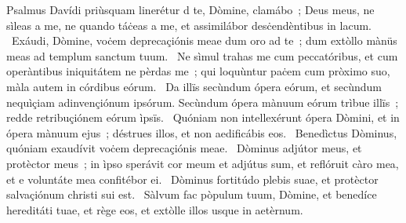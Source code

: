 { Psalmus Davídi priùsquam linerétur}
{%
d te, Dòmine, clamábo~; Deus meus, ne sìleas a me, ne quando táċeas a me, et assimilábor desċendèntibus in lacum. 
~Exáudi, Dòmine, voċem deprecaçiónis meae dum oro ad te~; dum extòllo mànüs meas ad templum sanctum tuum. 
~Ne sìmul trahas me cum peccatóribus, et cum operàntibus iniquitátem ne pèrdas me~; qui loquùntur paċem cum pròximo suo, màla autem in córdibus eórum. 
~Da illïs secùndum ópera eórum, et secùndum nequìçiam adinvençiónum ipsórum. Secùndum ópera mànuum eórum trìbue illïs~; redde retribuçiónem eórum ìpsïs. 
~Quóniam non intellexérunt ópera Dòmini, et in ópera mànuum ejus~; déstrues illos, et non aedificábis eos. 
~Benedìctus Dòminus, quóniam exaudívit voċem deprecaçiónis meae. 
~Dòminus adjútor meus, et protèctor meus~; in ìpso sperávit cor meum et adjútus sum, et reflóruit càro mea, et e voluntáte mea confitébor ei. 
~Dòminus fortitúdo plebis suae, et protèctor salvaçiónum christi sui est. 
~Sàlvum fac pòpulum tuum, Dòmine, et benedíce hereditáti tuae, et rège eos, et extòlle illos usque in aetèrnum. 
}
